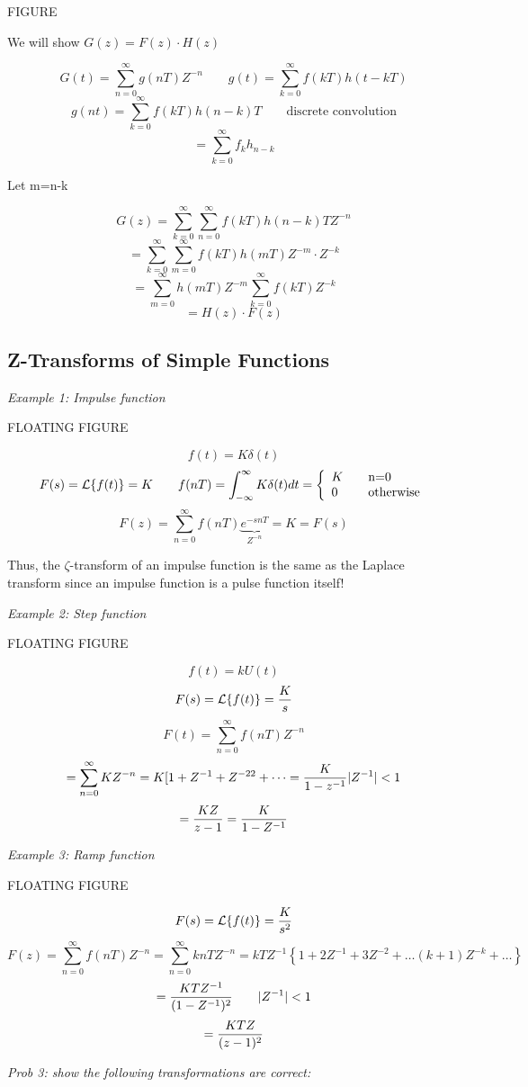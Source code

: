 \documentclass[11pt,fleqn]{book} %
\begin{document}
FIGURE

We will show $G(z)=F(z)\cdot H(z)$

$$G(t)=\sum_{n=0}^\infty g(nT)Z^{-n}\qquad g(t)=\sum_{k=0}^\infty f(kT)h(t-kT)$$
$$g(nt)=\sum_{k=0}^\infty f(kT)h(n-k)T\qquad \text{discrete convolution}$$
$$=\sum_{k=0}^\infty f_kh_{n-k}$$

Let m=n-k

$$G(z)=\sum_{k=0}^\infty \sum_{n=0}^\infty f(kT)h(n-k)TZ^{-n}$$
$$=\sum_{k=0}^\infty \sum_{m=0}^\infty f(kT)h(mT)Z^{-m}\cdot Z^{-k}$$
$$=\sum_{m=0}^\infty h(mT)Z^{-m}\sum_{k=0}^\infty f(kT)Z^{-k}$$
$$=H(z)\cdot F(z)$$

\subsection{Z-Transforms of Simple Functions}

\textit{Example 1: Impulse function}

FLOATING FIGURE

$$f(t)=K\delta (t)$$
$$F(s)=\mathcal{L}\{f(t)\}=K\qquad f(nT)=\int_{-\infty}^\infty K\delta(t)dt=\left\{
\begin{array}{l l}
    K & \quad \text{n=0}\\
    0 & \quad \text{otherwise}
  \end{array} \right.$$
  $$F(z)=\sum_{n=0}^\infty f(nT)\underbrace{e^{-snT}}_{Z^{-n}}=K=F(s)$$

Thus, the $\zeta$-transform of an impulse function is the same as the Laplace transform since an impulse function is a pulse function itself!

\textit{Example 2: Step function}

FLOATING FIGURE

$$f(t)=kU(t)$$
$$F(s)=\mathcal{L}\{f(t)\}={K\over s}$$
$$F(t)=\sum_{n=0}^\infty f(nT)Z^{-n}$$
$$=\sum_{n=0}^\infty KZ^{-n}=K[1+Z^{-1}+Z^{-22}+\dots={K\over 1-z^{-1}}|Z^{-1}|<1$$
$$={KZ\over z-1}={K\over 1-Z^{-1}}$$

\textit{Example 3: Ramp function}

FLOATING FIGURE

$$F(s)=\mathcal{L}\{f(t)\}={K\over s^2}$$
$$F(z)=\sum_{n=0}^\infty f(nT)Z^{-n}=\sum_{n=0}^\infty knTZ^{-n}=kTZ^{-1}\left\{1+2Z^{-1}+3Z^{-2}+\dots(k+1)Z^{-k}+\dots\right\}$$
$$={KTZ^{-1}\over(1-Z^{-1})^2}\qquad|Z^{-1}|<1$$
$$={KTZ\over(z-1)^2}$$

\textit{Prob 3: show the following transformations are correct:}
\end{document}
